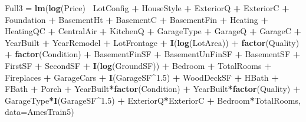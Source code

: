 \documentclass[
]{article}
\newenvironment{Shaded}{\begin{snugshade}}{\end{snugshade}}
\newcommand{\DataTypeTok}[1]{\textcolor[rgb]{0.13,0.29,0.53}{#1}}
\newcommand{\FloatTok}[1]{\textcolor[rgb]{0.00,0.00,0.81}{#1}}
\newcommand{\KeywordTok}[1]{\textcolor[rgb]{0.13,0.29,0.53}{\textbf{#1}}}
\newcommand{\NormalTok}[1]{#1}
\newcommand{\OperatorTok}[1]{\textcolor[rgb]{0.81,0.36,0.00}{\textbf{#1}}}
\newcommand{\StringTok}[1]{\textcolor[rgb]{0.31,0.60,0.02}{#1}}
\begin{document}
\begin{Shaded}
\begin{Highlighting}[]
\NormalTok{Full3 =}\StringTok{ }\KeywordTok{lm}\NormalTok{(}\KeywordTok{log}\NormalTok{(Price)}\OperatorTok{~}
\StringTok{            }\NormalTok{LotConfig }\OperatorTok{+}\StringTok{ }\NormalTok{HouseStyle }\OperatorTok{+}\StringTok{ }\NormalTok{ExteriorQ }\OperatorTok{+}\StringTok{ }\NormalTok{ExteriorC }\OperatorTok{+}\StringTok{ }\NormalTok{Foundation }\OperatorTok{+}\StringTok{ }\NormalTok{BasementHt }\OperatorTok{+}\StringTok{ }\NormalTok{BasementC }\OperatorTok{+}\StringTok{ }\NormalTok{BasementFin }\OperatorTok{+}\StringTok{ }\NormalTok{Heating }\OperatorTok{+}\StringTok{ }\NormalTok{HeatingQC }\OperatorTok{+}\StringTok{ }\NormalTok{CentralAir }\OperatorTok{+}\StringTok{ }\NormalTok{KitchenQ }\OperatorTok{+}\StringTok{ }\NormalTok{GarageType }\OperatorTok{+}\StringTok{ }\NormalTok{GarageQ }\OperatorTok{+}\StringTok{ }\NormalTok{GarageC }\OperatorTok{+}\StringTok{ }\NormalTok{YearBuilt }\OperatorTok{+}\StringTok{ }\NormalTok{YearRemodel }\OperatorTok{+}\StringTok{ }\NormalTok{LotFrontage }\OperatorTok{+}\StringTok{ }\KeywordTok{I}\NormalTok{(}\KeywordTok{log}\NormalTok{(LotArea)) }\OperatorTok{+}\StringTok{ }\KeywordTok{factor}\NormalTok{(Quality) }\OperatorTok{+}\StringTok{ }\KeywordTok{factor}\NormalTok{(Condition) }\OperatorTok{+}\StringTok{ }\NormalTok{BasementFinSF }\OperatorTok{+}\StringTok{ }\NormalTok{BasementUnFinSF }\OperatorTok{+}\StringTok{ }\NormalTok{BasementSF }\OperatorTok{+}\StringTok{ }\NormalTok{FirstSF }\OperatorTok{+}\StringTok{ }\NormalTok{SecondSF }\OperatorTok{+}\StringTok{ }\KeywordTok{I}\NormalTok{(}\KeywordTok{log}\NormalTok{(GroundSF)) }\OperatorTok{+}\StringTok{ }\NormalTok{Bedroom }\OperatorTok{+}\StringTok{ }\NormalTok{TotalRooms }\OperatorTok{+}\StringTok{ }\NormalTok{Fireplaces }\OperatorTok{+}\StringTok{ }\NormalTok{GarageCars }\OperatorTok{+}\StringTok{ }\KeywordTok{I}\NormalTok{(GarageSF}\OperatorTok{^}\FloatTok{1.5}\NormalTok{) }\OperatorTok{+}\StringTok{ }\NormalTok{WoodDeckSF }\OperatorTok{+}\StringTok{ }\NormalTok{HBath }\OperatorTok{+}\StringTok{ }\NormalTok{FBath }\OperatorTok{+}\StringTok{ }\NormalTok{Porch }\OperatorTok{+}\StringTok{ }\NormalTok{YearBuilt}\OperatorTok{*}\KeywordTok{factor}\NormalTok{(Condition) }\OperatorTok{+}\StringTok{ }\NormalTok{YearBuilt}\OperatorTok{*}\KeywordTok{factor}\NormalTok{(Quality) }\OperatorTok{+}\StringTok{ }\NormalTok{GarageType}\OperatorTok{*}\KeywordTok{I}\NormalTok{(GarageSF}\OperatorTok{^}\FloatTok{1.5}\NormalTok{) }\OperatorTok{+}\StringTok{ }\NormalTok{ExteriorQ}\OperatorTok{*}\NormalTok{ExteriorC }\OperatorTok{+}\StringTok{ }\NormalTok{Bedroom}\OperatorTok{*}\NormalTok{TotalRooms, }\DataTypeTok{data=}\NormalTok{AmesTrain5)}
\end{Highlighting}
\end{Shaded}
\end{document}

